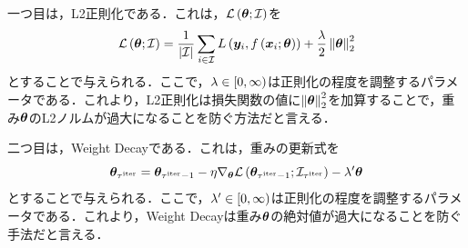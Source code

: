 一つ目は，L2正則化である．これは，$\mathcal{L}\left(\bm{\theta}; \mathcal{I}\right)$を
\begin{equation}
    \label{sec3:eq:l2_reg}
    \mathcal{L}\left(\bm{\theta}; \mathcal{I}\right) = \frac{1}{|\mathcal{I}|} \sum_{i \in \mathcal{I}} L\left(\bm{y}_{i}, f\left(\bm{x}_{i}; \bm{\theta}\right)\right) + \frac{\lambda}{2} \left\|\bm{\theta}\right\|_{2}^{2}
\end{equation}
とすることで与えられる．ここで，$\lambda \in \left[0, \infty\right)$は正則化の程度を調整するパラメータである．これより，L2正則化は損失関数の値に$\left\|\bm{\theta}\right\|_{2}^{2}$を加算することで，重み$\bm{\theta}$のL2ノルムが過大になることを防ぐ方法だと言える．

二つ目は，Weight Decayである．これは，重みの更新式を
\begin{equation}
    \label{sec3:eq:weight_decay}
    \bm{\theta}_{\tau^{\text{iter}}} = \bm{\theta}_{\tau^{\text{iter}} - 1} - \eta \nabla_{\bm{\theta}} \mathcal{L}\left(\bm{\theta}_{\tau^{\text{iter}} - 1}; \mathcal{I}_{\tau^{\text{iter}}}\right) - \lambda' \bm{\theta}
\end{equation}
とすることで与えられる．ここで，$\lambda' \in \left[0, \infty\right)$は正則化の程度を調整するパラメータである．これより，Weight Decayは重み$\bm{\theta}$の絶対値が過大になることを防ぐ手法だと言える．

